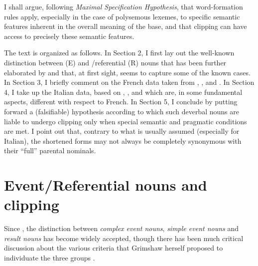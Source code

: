 \documentclass[output=paper]{langsci/langscibook}
\begin{document}
I shall argue, following %
%
\emph{Maximal Specification Hypothesis}, that word-formation rules
apply, especially in the case of polysemous lexemes, to specific
semantic features inherent in the overall meaning of the base, and that
clipping can have access to precisely these semantic features.

The text is organized as follows. In Section 2, I first lay out the
well-known distinction between  (E) and /referential (R)
nouns  that has been further elaborated by %
\citet{Melloni2006,Melloni2007,Melloni2011} %
%
and
that, at first sight, seems to capture some of the known cases. In
Section 3, I briefly comment on the French data taken from %
\citet{Kerleroux1997}%
, %
\citet{Fradin03b}%
%
, and %
\citet{Fradin2003}%
%
. In Section 4, I
take up the Italian data, based on %
\citet{Thornton1990a,Thornton2004}%
%
, %
\citet{Stichauer2006}%
, and %
\citet{MonterminiThornton2014} %
%
which are, in some fundamental
aspects, different with respect to French. In Section 5, I conclude
by putting forward a (falsifiable) hypothesis according to which such
deverbal nouns are liable to undergo clipping only when special semantic
and pragmatic conditions are met. I point out that, contrary to what is
usually assumed (especially for Italian), the shortened forms may not
always be completely synonymous with their ``full'' parental nominals.

\section{Event/Referential nouns  and
clipping}\label{Stekauer-eventreferential-nouns-and-clipping}

Since %
\citet{Grimshaw1990}%
%
, the distinction between \emph{complex event
nouns}, \emph{simple event nouns}  and \emph{result nouns}  has become
widely accepted, though there has been much critical discussion about
the various criteria that Grimshaw herself proposed to individuate the
three groups %
\citep[see][21--34]{Melloni2011}%
%
.
\end{document}
